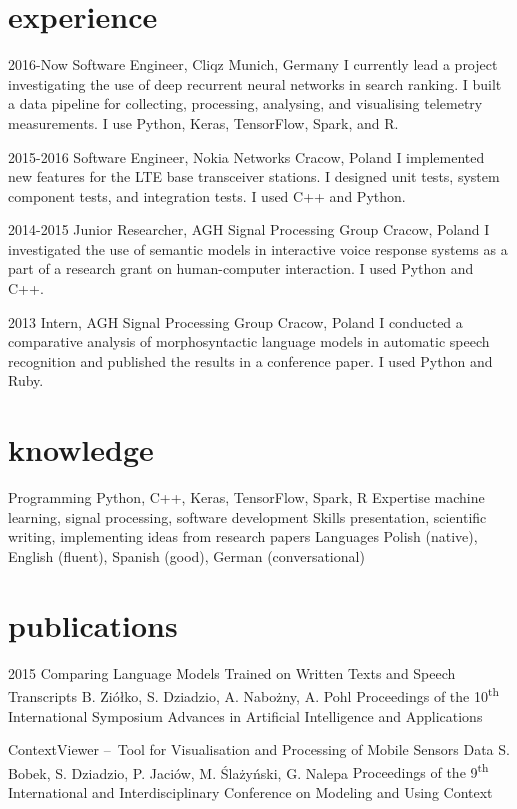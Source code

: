 \documentclass[]{friggeri-cv_osx}
\begin{document}
\section{experience}
\begin{entrylist}
\entry
{2016-Now}
{Software Engineer, Cliqz}
{Munich, Germany}
{I currently lead a project investigating the use of deep recurrent neural networks in search ranking. I built a data pipeline for collecting, processing, analysing, and visualising telemetry measurements. I use Python, Keras, TensorFlow, Spark, and R.\\}

\entry
{2015-2016}
{Software Engineer, Nokia Networks}
{Cracow, Poland}
{I implemented new features for the LTE base transceiver stations. I designed unit tests, system component tests, and integration tests. I used C++ and Python.\\}

\entry
{2014-2015}
{Junior Researcher, AGH Signal Processing Group}
{Cracow, Poland}
{I investigated the use of semantic models in interactive voice response systems as a part of a research grant on human-computer interaction. I used Python and C++.\\}

\entry
{2013}
{Intern, AGH Signal Processing Group}
{Cracow, Poland}
{I conducted a comparative analysis of morphosyntactic language models in automatic speech recognition and published the results in a conference paper. I used Python and Ruby.\\}
\end{entrylist}


\section{knowledge}
\begin{entrylist}
\entry
{}
{Programming}
{}
{Python, C++, Keras, TensorFlow, Spark, R}
\entry
{}
{Expertise}
{}
{machine learning, signal processing, software development}
\entry
{}
{Skills}
{}
{presentation, scientific writing, implementing ideas from research papers}
\entry
{}
{Languages}
{}
{Polish (native), English (fluent), Spanish (good), German (conversational)}
\end{entrylist}


\section{publications}
\begin{entrylist}
\entry
{2015}
{Comparing Language Models Trained on Written Texts and Speech Transcripts}
{B. Ziółko, S. Dziadzio, A. Nabożny, A. Pohl}
{Proceedings of the 10\textsuperscript{th} International Symposium Advances in Artificial Intelligence and Applications\\}

\entry
{}
{ContextViewer – Tool for Visualisation and Processing of Mobile Sensors Data}
{S. Bobek, S. Dziadzio, P. Jaciów, M. Ślażyński, G. Nalepa}
{Proceedings of the 9\textsuperscript{th} International and Interdisciplinary Conference on Modeling and Using Context\\}
\end{entrylist}
\end{document}
